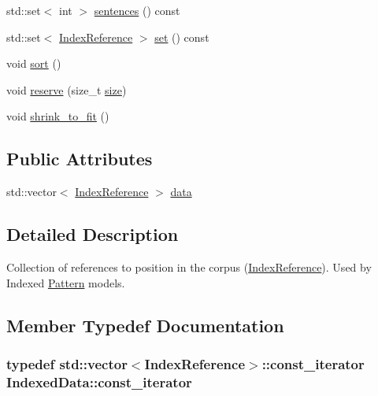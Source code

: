 \begin{DoxyCompactItemize}
\item 
std\+::set$<$ int $>$ \hyperlink{classIndexedData_aad19648fb455c7331b978c3c8edb5d95}{sentences} () const 
\item 
std\+::set$<$ \hyperlink{classIndexReference}{Index\+Reference} $>$ \hyperlink{classIndexedData_a006113bf89af3c679ba662e81e6a8195}{set} () const 
\item 
void \hyperlink{classIndexedData_a50ea650221c0ced471d47c0281e8a99b}{sort} ()
\item 
void \hyperlink{classIndexedData_a5c313c46241aeffc7719604bd9718ea8}{reserve} (size\+\_\+t \hyperlink{classIndexedData_af88d0d05140d9fb457de89a3f22029b7}{size})
\item 
void \hyperlink{classIndexedData_ab425918fcc283699452d3120e83323e5}{shrink\+\_\+to\+\_\+fit} ()
\end{DoxyCompactItemize}
\subsection*{Public Attributes}
\begin{DoxyCompactItemize}
\item 
std\+::vector$<$ \hyperlink{classIndexReference}{Index\+Reference} $>$ \hyperlink{classIndexedData_a9f509602ab26d3ba012b6d3fc461c4e7}{data}
\end{DoxyCompactItemize}


\subsection{Detailed Description}
Collection of references to position in the corpus (\hyperlink{classIndexReference}{Index\+Reference}). Used by Indexed \hyperlink{classPattern}{Pattern} models. 

\subsection{Member Typedef Documentation}
\hypertarget{classIndexedData_a8fb4f6765def0ce366381f0b0aa5c04a}{}
\subsubsection[{const\+\_\+iterator}]{\setlength{\rightskip}{0pt plus 5cm}typedef std\+::vector$<${\bf Index\+Reference}$>$\+::{\bf const\+\_\+iterator} {\bf Indexed\+Data\+::const\+\_\+iterator}}\label{classIndexedData_a8fb4f6765def0ce366381f0b0aa5c04a}
\hypertarget{classIndexedData_a92375fc0f92911f92908da2251d70fde}{}
